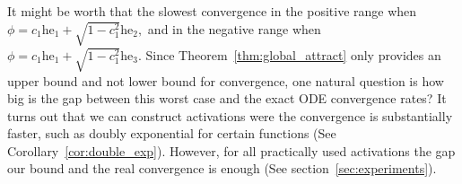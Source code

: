 \documentclass[twoside]{article}
\newcommand{\E}{\mathbb{E}\,}
\newcommand{\he}{\mathrm{he}}
\theoremstyle{definition}
\newcommand{\thomas}[1]{{\color{blue}TH:  \textit{#1}}}
\begin{document}
It might be worth that the slowest convergence in the positive range when $\phi  = c_1 \he_1 + \sqrt{1-c_1^2}\he_2,$ and in the negative range when $\phi  = c_1 \he_1 + \sqrt{1-c_1^2}\he_3.$ Since Theorem~\ref{thm:global_attract} only provides an upper bound and not lower bound for convergence, one natural question is how big is the gap between this worst case and the exact ODE convergence rates? It turns out that we can construct activations were the convergence is substantially faster, such as doubly exponential for certain functions (See Corollary~\ref{cor:double_exp}). However, for all practically used activations the gap our bound and the real convergence is enough (See section~\ref{sec:experiments}).




% 



 
\end{document}
